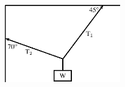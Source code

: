 \begin{enumerate}[noitemsep, label=\textbf{\arabic*}. ]
    \setcounter{subfigure}{0}


	\begin{figure}[H] %
    \begin{center}
    \label{m38819*id198746!!!underscore!!!media}\label{m38819*id198746!!!underscore!!!printimage}\includegraphics[width=5cm]{col11305.imgs/m38819_PG11C1_080.png} %
        
      \vspace{2pt}
    \vspace{.1in}
    
    \end{center}

 \end{figure}   


\end{enumerate}
